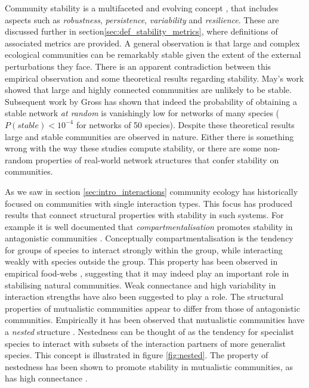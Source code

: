 Community stability is a multifaceted and evolving concept \cite{lurgi2015effects,montoya2016invariability,arnoldi2015,wang2006inferring}, that includes aspects such as \emph{robustness}, \emph{persistence}, \emph{variability} and \emph{resilience}. These are discussed further in section\ref{sec:def_stability_metrics}, where definitions of associated metrics are provided. A general observation is that large and complex ecological communities can be remarkably stable given the extent of the external perturbations they face. There is an apparent contradiction between this empirical observation and some theoretical results regarding stability. May's work \cite{may1972will} showed that large and highly connected communities are unlikely to be stable. Subsequent work by Gross \cite{gross2009generalized} has shown that indeed the probability of obtaining a stable network \emph{at random} is vanishingly low for networks of many species ($P(stable) < 10^{-4}$ for networks of 50 species). Despite these theoretical results large and stable communities are observed in nature. Either there is something wrong with the way these studies compute stability, or there are some non-random properties of real-world network structures that confer stability on communities.  


As we saw in section \ref{sec:intro_interactions} community ecology has historically focused on communities with single interaction types. This focus has produced results that connect structural properties with stability in such systems. For example it is well documented that \emph{compartmentalisation} promotes stability in antagonistic communities \cite{stouffer2011compartmentalization,thebault2010stability}. Conceptually compartmentalisation is the tendency for groups of species to interact strongly within the group, while interacting weakly with species outside the group. This property has been observed in empirical food-webs \cite{stouffer2011compartmentalization}, suggesting that it may indeed play an important role in stabilising natural communities. Weak connectance \cite{may1972will,thebault2010stability} and high variability in interaction strengths \cite{van2016food, jansen2003complexity} have also been suggested to play a role. The structural properties of mutualistic communities appear to differ from those of antagonistic communities. Empirically it has been observed that mutualistic communities have a \emph{nested} structure \cite{bascompte2007plant}. Nestedness can be thought of as the tendency for specialist species to interact with subsets of the interaction partners of more generalist species. This concept is illustrated in figure \ref{fig:nested}. The property of nestedness has been shown to promote stability in mutualistic communities, as has high connectance \cite{thebault2010stability}. 

